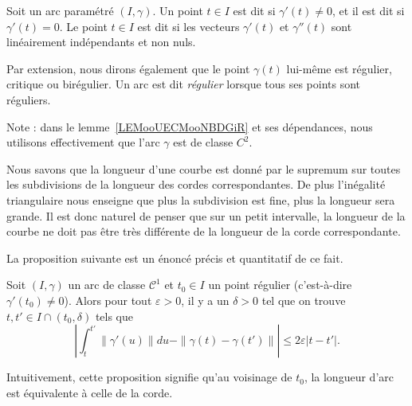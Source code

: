 \begin{definition}
	Soit un arc paramétré \( (I,\gamma)\). Un point \( t\in I\) est dit  si \( \gamma'(t)\neq 0\), et il est dit  si \( \gamma'(t)=0\). Le point \( t\in I\) est dit  si les vecteurs \( \gamma'(t)\) et \( \gamma''(t)\) sont linéairement indépendants et non nuls.

	Par extension, nous dirons également que le point \( \gamma(t)\) lui-même est régulier, critique ou birégulier. Un arc est dit \emph{régulier} lorsque tous ses points sont réguliers.
\end{definition}
Note : dans le lemme~\ref{LEMooUECMooNBDGiR} et ses dépendances, nous utilisons effectivement que l'arc \( \gamma\) est de classe \( C^2\).

Nous savons que la longueur d'une courbe est donné par le supremum sur toutes les subdivisions de la longueur des cordes correspondantes. De plus l'inégalité triangulaire nous enseigne que plus la subdivision est fine, plus la longueur sera grande. Il est donc naturel de penser que sur un petit intervalle, la longueur de la courbe ne doit pas être très différente de la longueur de la corde correspondante.

La proposition suivante est un énoncé précis et quantitatif de ce fait.
\begin{proposition}
	Soit \( (I,\gamma)\) un arc de classe \( \mathcal{C}^1\) et \( t_0\in I\) un point régulier (c'est-à-dire \( \gamma'(t_0)\neq 0\)). Alors pour tout \( \varepsilon>0\), il y a un \( \delta>0\) tel que on trouve  \( t,t'\in I\cap(t_0,\delta)\) tels que
	\begin{equation}
		\left| \int_t^{t'}\| \gamma'(u) \|du-\| \gamma(t)-\gamma(t') \| \right| \leq 2\varepsilon| t-t' |.
	\end{equation}
\end{proposition}
Intuitivement, cette proposition signifie qu'au voisinage de \( t_0\), la longueur d'arc est équivalente à celle de la corde.

